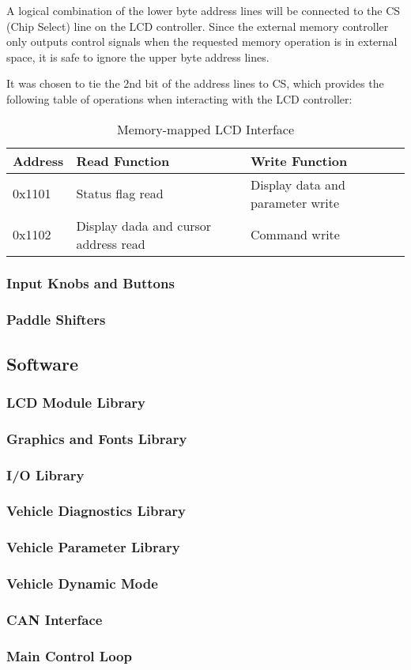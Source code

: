 A logical combination of the lower byte address lines will be connected to the CS (Chip Select) line on the LCD controller. Since the external memory controller only outputs control signals when the requested memory operation is in external space, it is safe to ignore the upper byte address lines.

It was chosen to tie the 2nd bit of the address lines to CS, which provides the following table of operations when interacting with the LCD controller:

\begin{table}
\caption{Memory-mapped LCD Interface}
\centering{}
\begin{tabular}{|l|l|l|}
\hline 
Address  & Read Function  & Write Function\tabularnewline
\hline
\hline 
0x1101  & Status flag read  & Display data and parameter write\tabularnewline
\hline 
0x1102  & Display dada and cursor address read  & Command write\tabularnewline
\hline
\end{tabular}
\end{table}

\subsubsection{Input Knobs and Buttons}


\subsubsection{Paddle Shifters}

\subsection{Software}


\subsubsection{LCD Module Library}


\subsubsection{Graphics and Fonts Library}


\subsubsection{I/O Library}


\subsubsection{Vehicle Diagnostics Library}


\subsubsection{Vehicle Parameter Library}


\subsubsection{Vehicle Dynamic Mode}


\subsubsection{CAN Interface}


\subsubsection{Main Control Loop}